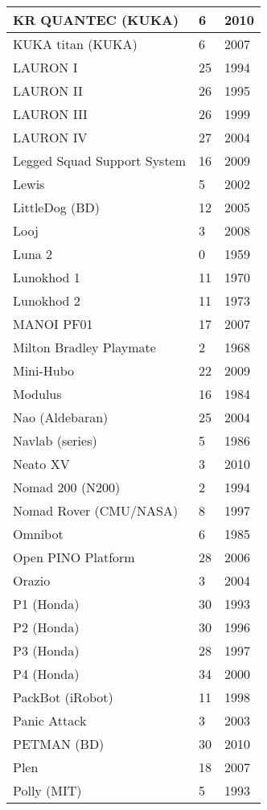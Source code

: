 \begin{center}
\begin{longtable}{l | l | l }
KR QUANTEC (KUKA)	&	6	&	2010	\\	\hline
KUKA titan (KUKA)	&	6	&	2007	\\	\hline
LAURON I	&	25	&	1994	\\	\hline
LAURON II	&	26	&	1995	\\	\hline
LAURON III	&	26	&	1999	\\	\hline
LAURON IV	&	27	&	2004	\\	\hline
Legged Squad Support System	&	16	&	2009	\\	\hline
Lewis	&	5	&	2002	\\	\hline
LittleDog (BD)	&	12	&	2005	\\	\hline
Looj	&	3	&	2008	\\	\hline
Luna 2	&	0	&	1959	\\	\hline
Lunokhod 1	&	11	&	1970	\\	\hline
Lunokhod 2	&	11	&	1973	\\	\hline
MANOI PF01	&	17	&	2007	\\	\hline
Milton Bradley Playmate	&	2	&	1968	\\	\hline
Mini-Hubo	&	22	&	2009	\\	\hline
Modulus	&	16	&	1984	\\	\hline
Nao (Aldebaran)	&	25	&	2004	\\	\hline
Navlab (series)	&	5	&	1986	\\	\hline
Neato XV	&	3	&	2010	\\	\hline
Nomad 200 (N200)	&	2	&	1994	\\	\hline
Nomad Rover (CMU/NASA)	&	8	&	1997	\\	\hline
Omnibot	&	6	&	1985	\\	\hline
Open PINO Platform	&	28	&	2006	\\	\hline
Orazio	&	3	&	2004	\\	\hline
P1 (Honda) \cite{robotsAsimo1041641}	&	30	&	1993	\\	\hline
P2 (Honda) \cite{robotsAsimo1041641}&	30	&	1996	\\	\hline
P3 (Honda) \cite{robotsAsimo1041641}	&	28	&	1997	\\	\hline
P4 (Honda) \cite{robotsAsimo1041641}	&	34	&	2000	\\	\hline
PackBot (iRobot)	&	11	&	1998	\\	\hline
Panic Attack	&	3	&	2003	\\	\hline
PETMAN (BD)	&	30	&	2010	\\	\hline
Plen	&	18	&	2007	\\	\hline
Polly (MIT)	&	5	&	1993	\\	\hline

\end{longtable}
\end{center}
